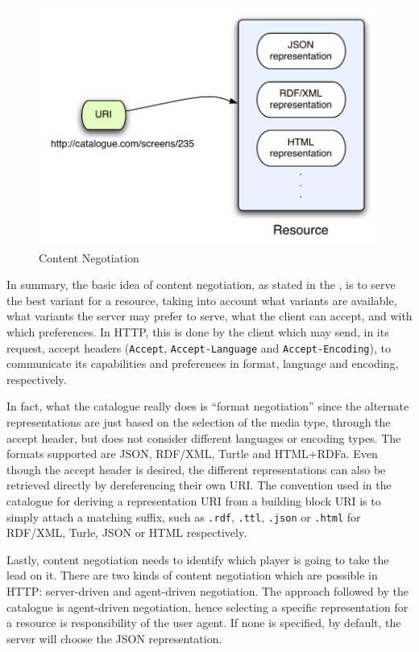 \documentclass{fast_latex}
\begin{document}
\begin{figure}[htb]
\label{fig:content_negotiation}
\begin{center}
	\includegraphics[width=12cm]{images/content_negotiation}
	\caption{Content Negotiation}
\end{center}
\end{figure}

In summary, the basic idea of content negotiation, as stated in the \cite{http1.1}, is to serve the best variant for a resource, taking into account what variants are available, what variants the server may prefer to serve, what the client can accept, and with which preferences. In HTTP, this is done by the client which may send, in its request, accept headers (\texttt{Accept}, \texttt{Accept-Language} and \texttt{Accept-Encoding}), to communicate its capabilities and preferences in format, language and encoding, respectively.

In fact, what the catalogue really does is ``format negotiation'' since the alternate representations are just based on the selection of the media type, through the accept header, but does not consider different languages or encoding types. The formats supported are JSON, RDF/XML, Turtle and HTML+RDFa. Even though the accept header is desired, the different representations can also be retrieved directly by dereferencing their own URI. The convention used in the catalogue for deriving a representation URI from a building block URI is to simply attach a matching suffix, such as \texttt{.rdf}, \texttt{.ttl}, \texttt{.json} or \texttt{.html} for RDF/XML, Turle, JSON or HTML respectively.

Lastly, content negotiation needs to identify which player is going to take the lead on it. There are two kinds of content negotiation which are possible in HTTP: server-driven and agent-driven negotiation. The approach followed by the catalogue is agent-driven negotiation, hence selecting a specific representation for a resource is responsibility of the user agent. If none is specified, by default, the server will choose the JSON representation.
\end{document}

